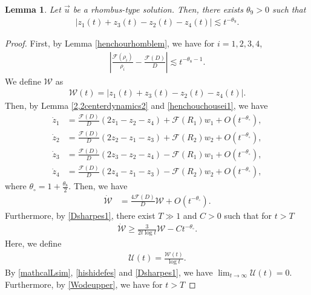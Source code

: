 \documentclass[reqno]{amsart}
\theoremstyle{plain}
\newtheorem{lemma}[theorem]{Lemma}
\theoremstyle{definition}
\numberwithin{equation}{section}
\begin{document}
\begin{lemma}\label{naisekirhomblem2}
Let $\vec{u}$ be a rhombus-type solution. Then, there exists $\theta_9>0$ such that 
\begin{align}\label{heimenseies1}
\left|z_1(t)+z_3(t)-z_2(t)-z_4(t)\right|\lesssim t^{-\theta_9}.
\end{align}
\end{lemma}
\begin{proof}
First, by Lemma \ref{henchourhomblem}, we have for $i=1,2,3,4$,
\begin{align}\label{henchouchousei1}
\left|\frac{\mathcal{F}(\rho_i)}{\rho_i}-\frac{\mathcal{F}(D)}{D}\right|\lesssim t^{-\theta_8-1}.
\end{align}
We define $\mathcal{W}$ as 
\begin{align*}
\mathcal{W}(t)=\left|z_1(t)+z_3(t)-z_2(t)-z_4(t)\right|.
\end{align*}
Then, by Lemma \ref{2,2centerdynamics2} and \eqref{henchouchousei1}, we have
\begin{align*}
\dot{z}_1&=\frac{\mathcal{F}(D)}{D}\left(2z_1-z_2-z_4\right)+\mathcal{F}(R_1)w_1+O\left(t^{-\theta_{\circ}}\right),
\\
\dot{z}_2&=\frac{\mathcal{F}(D)}{D}\left(2z_2-z_1-z_3\right)+\mathcal{F}(R_2)w_2+O\left(t^{-\theta_{\circ}}\right),
\\
\dot{z}_3&=\frac{\mathcal{F}(D)}{D}\left(2z_3-z_2-z_4\right)-\mathcal{F}(R_1)w_1+O\left(t^{-\theta_{\circ}}\right),
\\
\dot{z}_4&=\frac{\mathcal{F}(D)}{D}\left(2z_4-z_1-z_3\right)-\mathcal{F}(R_2)w_2+O\left(t^{-\theta_{\circ}}\right),
\end{align*}
where $\theta_{\circ}=1+\frac{\theta_8}{2}$. Then, we have
\begin{align}\label{mathcalWbibun}
\dot{\mathcal{W}}&=\frac{4\mathcal{F}(D)}{D}\mathcal{W}+O\left(t^{-\theta_{\circ}}\right).
\end{align}
Furthermore, by \eqref{Dsharpes1}, there exist $T\gg 1$ and $C>0$ such that for $t>T$
\begin{align}\label{Wodeupper}
\dot{\mathcal{W}}\geq \frac{3}{2t\log{t}}\mathcal{W}-Ct^{-\theta_{\circ}}.
\end{align}
Here, we define 
\begin{align*}
\mathcal{U}(t)=\frac{\mathcal{W}(t)}{\log{t}}.
\end{align*}
By \eqref{mathcalLsim},  \eqref{hishidefes} and \eqref{Dsharpes1}, we have $\lim_{t\to\infty} \mathcal{U}(t)=0$. Furthermore, by \eqref{Wodeupper}, we have for $t>T$

\end{proof}
\end{document}

